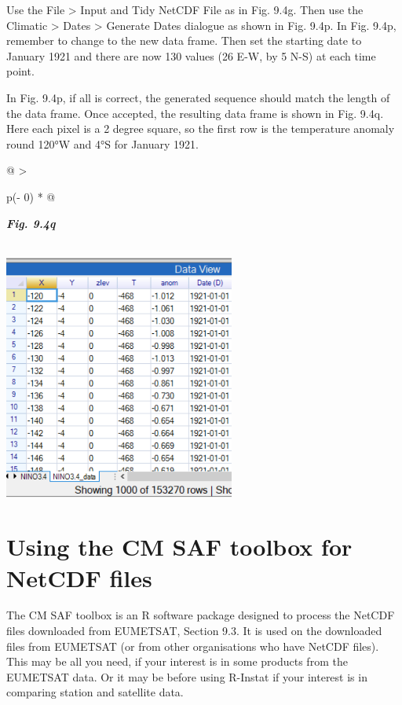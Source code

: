 \documentclass[
  letterpaper,
  DIV=11,
  numbers=noendperiod]{scrreprt}
\begin{document}
Use the File \textgreater{} Input and Tidy NetCDF File as in Fig. 9.4g.
Then use the Climatic \textgreater{} Dates \textgreater{} Generate Dates
dialogue as shown in Fig. 9.4p. In Fig. 9.4p, remember to change to the
new data frame. Then set the starting date to January 1921 and there are
now 130 values (26 E-W, by 5 N-S) at each time point.

In Fig. 9.4p, if all is correct, the generated sequence should match the
length of the data frame. Once accepted, the resulting data frame is
shown in Fig. 9.4q. Here each pixel is a 2 degree square, so the first
row is the temperature anomaly round 120°W and 4°S for January 1921.

\begin{longtable}[]{@{}
  >{\raggedright\arraybackslash}p{(\columnwidth - 0\tabcolsep) * }@{}}
\toprule\noalign{}
\begin{minipage}[b]{\linewidth}\raggedright
\textbf{\emph{Fig. 9.4q}}
\end{minipage} \\
\midrule\noalign{}
\endhead
\bottomrule\noalign{}
\endlastfoot
\includegraphics[width=2.99399in,height=3.17561in]{figures/Fig9.4q.png} \\
\end{longtable}

\section{Using the CM SAF toolbox for NetCDF
files}\label{using-the-cm-saf-toolbox-for-netcdf-files}

The CM SAF toolbox is an R software package designed to process the
NetCDF files downloaded from EUMETSAT, Section 9.3. It is used on the
downloaded files from EUMETSAT (or from other organisations who have
NetCDF files). This may be all you need, if your interest is in some
products from the EUMETSAT data. Or it may be before using R-Instat if
your interest is in comparing station and satellite data.
\end{document}
